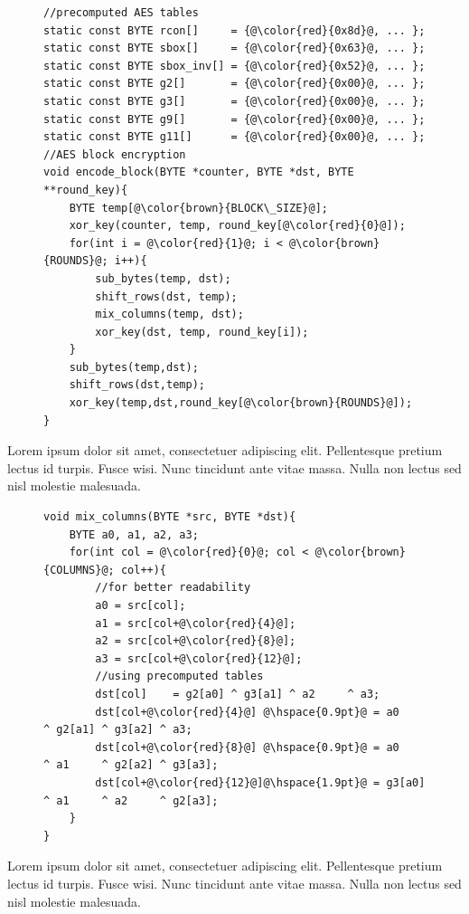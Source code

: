\begin{figure}[H]
\begin{lstlisting}
//precomputed AES tables
static const BYTE rcon[]     = {@\color{red}{0x8d}@, ... };
static const BYTE sbox[]     = {@\color{red}{0x63}@, ... };
static const BYTE sbox_inv[] = {@\color{red}{0x52}@, ... };
static const BYTE g2[]       = {@\color{red}{0x00}@, ... };
static const BYTE g3[]       = {@\color{red}{0x00}@, ... };
static const BYTE g9[]       = {@\color{red}{0x00}@, ... };
static const BYTE g11[]      = {@\color{red}{0x00}@, ... };
//AES block encryption
void encode_block(BYTE *counter, BYTE *dst, BYTE **round_key){
    BYTE temp[@\color{brown}{BLOCK\_SIZE}@];
    xor_key(counter, temp, round_key[@\color{red}{0}@]);
    for(int i = @\color{red}{1}@; i < @\color{brown}{ROUNDS}@; i++){
        sub_bytes(temp, dst);
        shift_rows(dst, temp);
        mix_columns(temp, dst);
        xor_key(dst, temp, round_key[i]);
    }
    sub_bytes(temp,dst);
    shift_rows(dst,temp);
    xor_key(temp,dst,round_key[@\color{brown}{ROUNDS}@]);
}
\end{lstlisting}
\end{figure}

Lorem ipsum dolor sit amet, consectetuer adipiscing elit. Pellentesque pretium lectus id turpis. Fusce wisi. Nunc tincidunt ante vitae massa. Nulla non lectus sed nisl molestie malesuada.

\begin{figure}[H]
\begin{lstlisting}
void mix_columns(BYTE *src, BYTE *dst){
    BYTE a0, a1, a2, a3;
    for(int col = @\color{red}{0}@; col < @\color{brown}{COLUMNS}@; col++){ 
        //for better readability
        a0 = src[col]; 
        a1 = src[col+@\color{red}{4}@];
        a2 = src[col+@\color{red}{8}@];
        a3 = src[col+@\color{red}{12}@];
        //using precomputed tables
        dst[col]    = g2[a0] ^ g3[a1] ^ a2     ^ a3;
        dst[col+@\color{red}{4}@] @\hspace{0.9pt}@ = a0     ^ g2[a1] ^ g3[a2] ^ a3;
        dst[col+@\color{red}{8}@] @\hspace{0.9pt}@ = a0     ^ a1     ^ g2[a2] ^ g3[a3];
        dst[col+@\color{red}{12}@]@\hspace{1.9pt}@ = g3[a0] ^ a1     ^ a2     ^ g2[a3];
    }
}
\end{lstlisting}
\end{figure}

Lorem ipsum dolor sit amet, consectetuer adipiscing elit. Pellentesque pretium lectus id turpis. Fusce wisi. Nunc tincidunt ante vitae massa. Nulla non lectus sed nisl molestie malesuada. 


